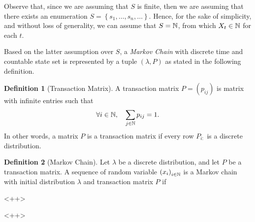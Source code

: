 \documentclass{report}
\theoremstyle{definition}
\newtheorem{defn}{Definition}
\begin{document}
Observe that, since we are assuming that $S$ is finite, then we are assuming
that there exists an enumeration $S=\left\{ s_1,\dots,s_n,\dots \right\}$.
Hence,  for the sake of simplicity, and without loss of generality, we can
assume that $S=\mathbb{N}$, from which $X_t\in\mathbb{N}$ for each $t$.

Based on the latter assumption over $S$, a \textit{Markov Chain}  with
discrete time and countable state set is represented by a tuple 
$\left( \lambda,P \right)$ as stated in the following definition.

\begin{defn}[Transaction Matrix]
  A transaction matrix $P=\left( p_{ij} \right)$ is matrix with infinite entries 
  such that
  \begin{equation}
    \forall i\in\mathbb{N},\quad \sum_{j\in\mathbb{N}} p_{ij} = 1.
    \label{eq:transaction-matrix}
  \end{equation}
  In other words, a matrix $P$ is a transaction matrix if every row $P_{i:}$
  is a discrete distribution.
\end{defn}
\begin{defn}[Markov Chain]
  Let $\lambda$ be a discrete distribution, and let $P$ be a transaction
  matrix. A sequence of random variable $\left( x_i \right)_{i\in\mathbb{N}}$ is a
  Markov chain with initial distribution $\lambda$ and transaction matrix
  $P$ if
  <++>
\end{defn}<++>
\end{document}
